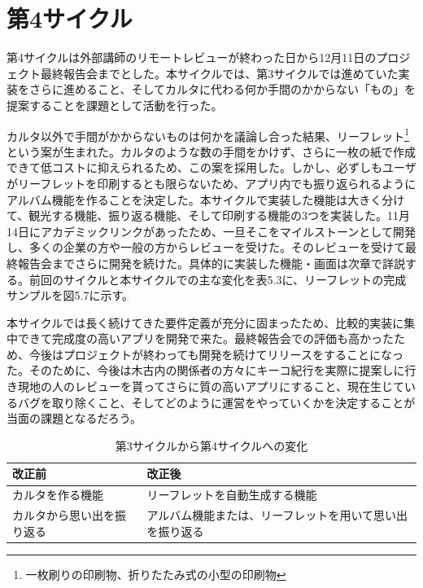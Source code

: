 \section{第4サイクル}
第4サイクルは外部講師のリモートレビューが終わった日から12月11日のプロジェクト最終報告会までとした。本サイクルでは、第3サイクルでは進めていた実装をさらに進めること、そしてカルタに代わる何か手間のかからない「もの」を提案することを課題として活動を行った。
\par カルタ以外で手間がかからないものは何かを議論し合った結果、リーフレット\footnote{一枚刷りの印刷物、折りたたみ式の小型の印刷物}という案が生まれた。カルタのような数の手間をかけず、さらに一枚の紙で作成できて低コストに抑えられるため、この案を採用した。しかし、必ずしもユーザがリーフレットを印刷するとも限らないため、アプリ内でも振り返られるようにアルバム機能を作ることを決定した。本サイクルで実装した機能は大きく分けて、観光する機能、振り返る機能、そして印刷する機能の3つを実装した。11月14日にアカデミックリンクがあったため、一旦そこをマイルストーンとして開発し、多くの企業の方や一般の方からレビューを受けた。そのレビューを受けて最終報告会までさらに開発を続けた。具体的に実装した機能・画面は次章で詳説する。前回のサイクルと本サイクルでの主な変化を表5.3に、リーフレットの完成サンプルを図5.7に示す。
\par 本サイクルでは長く続けてきた要件定義が充分に固まったため、比較的実装に集中できて完成度の高いアプリを開発で来た。最終報告会での評価も高かったため、今後はプロジェクトが終わっても開発を続けてリリースをすることになった。そのために、今後は木古内の関係者の方々にキーコ紀行を実際に提案しに行き現地の人のレビューを貰ってさらに質の高いアプリにすること、現在生じているバグを取り除くこと、そしてどのように運営をやっていくかを決定することが当面の課題となるだろう。

\begin{table}[htb]
\centering
\addtocounter{table}{+0}
\caption{第3サイクルから第4サイクルへの変化}
  \begin{tabular}{|l|l|} \hline
    改正前&改正後  \\ \hline 
    カルタを作る機能 & \parbox{20zw}{リーフレットを自動生成する機能} \\  \hline
    カルタから思い出を振り返る &\parbox{20zw}{アルバム機能または、リーフレットを用いて思い出を振り返る}\\ \hline
  \end{tabular} 
\end{table}


